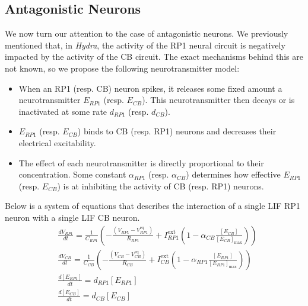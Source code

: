 \documentclass{article}
\begin{document}
\subsection{Antagonistic Neurons}
We now turn our attention to the case of antagonistic neurons. We previously mentioned that, in \textit{Hydra}, the activity of the RP1 neural circuit is negatively impacted by the activity of the CB circuit. The exact mechanisms behind this are not known, so we propose the following neurotransmitter model:
\begin{itemize}
    \item When an RP1 (resp. CB) neuron spikes, it releases some fixed amount a neurotransmitter $E_{RP1}$ (resp. $E_{CB}$). This neurotransmitter then decays or is inactivated at some rate $d_{RP1}$ (resp. $d_{CB}$).
    \item $E_{RP1}$ (resp. $E_{CB}$) binds to CB (resp. RP1) neurons and decreases their electrical excitability.
    \item The effect of each neurotransmitter is directly proportional to their concentration. Some constant $\alpha_{RP1}$ (resp. $\alpha_{CB}$) determines how effective $E_{RP1}$ (resp. $E_{CB}$) is at inhibiting the activity of CB (resp. RP1) neurons.
\end{itemize}
Below is a system of equations that describes the interaction of a single LIF RP1 neuron with a single LIF CB neuron.
\begin{align}
&\frac{dV_{RP1}}{dt}=\frac{1}{C_{RP1}}\left(-\frac{(V_{RP1}-V_{RP1}^{\mathrm{eq}})}{R_{RP1}}+I_{RP1}^{\mathrm{ext}}\left(1-\alpha_{CB}\frac{\left[E_{CB}\right]}{\left[E_{CB}\right]_{\max}}\right)\right)\\
&\frac{dV_{CB}}{dt}=\frac{1}{C_{CB}}\left(-\frac{(V_{CB}-V_{CB}^{\mathrm{eq}})}{R_{CB}}+I_{CB}^{\mathrm{ext}}\left(1-\alpha_{RP1}\frac{\left[E_{RP1}\right]}{\left[E_{RP1}\right]_{\max}}\right)\right)\\
&\frac{d\left[E_{RP1}\right]}{dt}=d_{RP1}\left[E_{RP1}\right]\\&\frac{d\left[E_{CB}\right]}{dt}=d_{CB}\left[E_{CB}\right]
\end{align}
\end{document}
